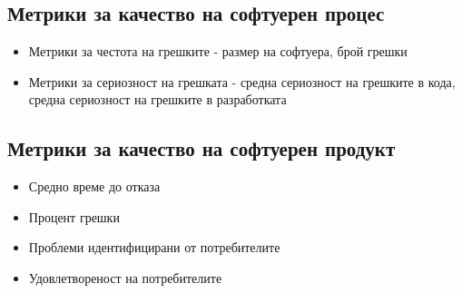 \documentclass[fleqn,12pt]{article}
\begin{document}
\begin{flushleft}
\subsection{Метрики за качество на софтуерен процес}
    \begin{itemize}
        \item Метрики за честота на грешките - размер на софтуера, брой грешки 
        \item Метрики за сериозност на грешката - средна сериозност на грешките в кода, средна сериозност на грешките в разработката
    \end{itemize}

\subsection{Метрики за качество на софтуерен продукт}
    \begin{itemize}
        \item Средно време до отказа
        \item Процент грешки
        \item Проблеми идентифицирани от потребителите
        \item Удовлетвореност на потребителите
    \end{itemize}

\end{flushleft}
\end{document}
